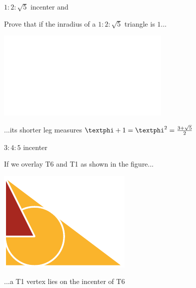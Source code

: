 \documentclass[14pt]{beamer}
\begin{document}

    \begin{frame}{$1\!\!:\!\!2\!\!:\!\!\sqrt{5}$ incenter and \textphi}
        \begin{center}
            Prove that if the inradius of a $1\!\!:\!\!2\!\!:\!\!\sqrt{5}$ triangle is $1$...

            \bigskip \bigskip

            \includegraphics[height=18ex]{figures/figure006a.pdf}

            \bigskip \bigskip

            ...its shorter leg measures $\text{\textphi}+1 = \text{\textphi}^2 = \frac{3+\sqrt{5}}{2}$
        \end{center}
    \end{frame}


    \begin{frame}{$3\!\!:\!\!4\!\!:\!\!5$ incenter}
        \begin{center}
            If we overlay T6 and T1 as shown in the figure...

            \bigskip \bigskip

            \includegraphics[height=18ex]{figures/figure006b.pdf}

            \bigskip \bigskip

            ...a T1 vertex lies on the incenter of T6
        \end{center}
    \end{frame}

\end{document}
